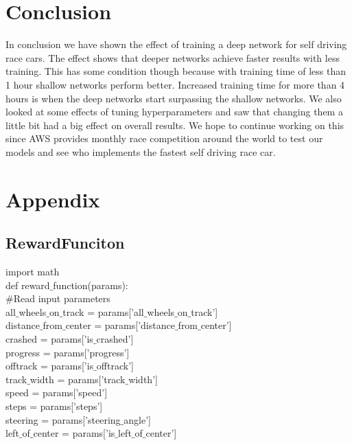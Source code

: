 \documentclass[journal]{IEEEtran}
\begin{document}
\section{Conclusion}
In conclusion we have shown the effect of training a deep network for self driving race cars.  The effect shows that deeper networks achieve faster results with less training.  This has some condition though because with training time of less than 1 hour shallow networks perform better.  Increased training time for more than 4 hours is when the deep networks start surpassing the shallow networks.  We also looked at some effects of tuning hyperparameters and saw that changing them a little bit had a big effect on overall results.  We hope to continue working on this since AWS provides monthly race competition around the world to test our models and see who implements the fastest self driving race car.




\newpage

\section{Appendix}

\subsection{RewardFunciton}
import math\\
def reward$\_$function(params):\\
  \#Read input parameters\\
    all$\_$wheels$\_$on$\_$track = params['all$\_$wheels$\_$on$\_$track']  \\
    distance$\_$from$\_$center = params['distance$\_$from$\_$center']  \\
    crashed = params['is$\_$crashed']  \\
    progress = params['progress']  \\
    offtrack = params['is$\_$offtrack']  \\
    track$\_$width = params['track$\_$width'] \\
    speed = params['speed'] \\
    steps = params['steps'] \\
    steering = params['steering$\_$angle']  \\
    left$\_$of$\_$center = params['is$\_$left$\_$of$\_$center']  \\
\end{document}
